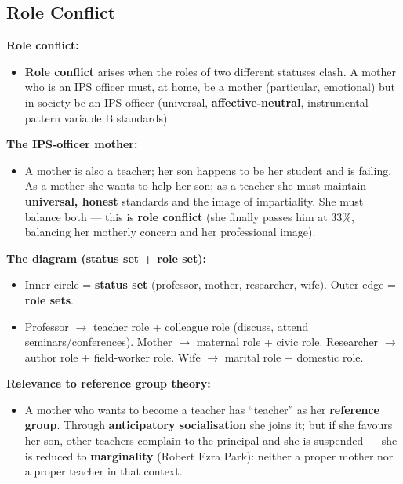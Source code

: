 \sectiondivider

\subsection{Role Conflict}

\begin{KeyConcept}
\textbf{Role conflict:}
\begin{itemize}
\item \textbf{Role conflict} arises when the roles of two different statuses clash. A mother who is an IPS officer must, at home, be a mother (particular, emotional) but in society be an IPS officer (universal, \textbf{affective-neutral}, instrumental --- pattern variable B standards).
\end{itemize}
\end{KeyConcept}

\begin{ExampleBox}
\textbf{The IPS-officer mother:}
\begin{itemize}
\item A mother is also a teacher; her son happens to be her student and is failing. As a mother she wants to help her son; as a teacher she must maintain \textbf{universal, honest} standards and the image of impartiality. She must balance both --- this is \textbf{role conflict} (she finally passes him at 33\%, balancing her motherly concern and her professional image).
\end{itemize}
\end{ExampleBox}

\begin{ComparisonBox}
\textbf{The diagram (status set + role set):}
\begin{itemize}
\item Inner circle = \textbf{status set} (professor, mother, researcher, wife). Outer edge = \textbf{role sets}.
\item Professor $\rightarrow$ teacher role + colleague role (discuss, attend seminars/conferences). Mother $\rightarrow$ maternal role + civic role. Researcher $\rightarrow$ author role + field-worker role. Wife $\rightarrow$ marital role + domestic role.
\end{itemize}
\end{ComparisonBox}

\begin{ExampleBox}
\textbf{Relevance to reference group theory:}
\begin{itemize}
\item A mother who wants to become a teacher has ``teacher'' as her \textbf{reference group}. Through \textbf{anticipatory socialisation} she joins it; but if she favours her son, other teachers complain to the principal and she is suspended --- she is reduced to \textbf{marginality} (Robert Ezra Park): neither a proper mother nor a proper teacher in that context.
\end{itemize}
\end{ExampleBox}

